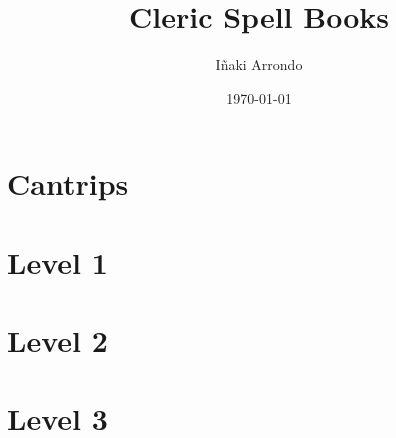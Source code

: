 \documentclass[a5paper,18pt]{book}
\title{Cleric Spell Books}
\author{Iñaki Arrondo}
\date{\today}
\begin{document}
\large

\maketitle

\tableofcontents
\chapter{Cantrips}










\chapter{Level 1}

















\chapter{Level 2}



















\chapter{Level 3}
\end{document}

